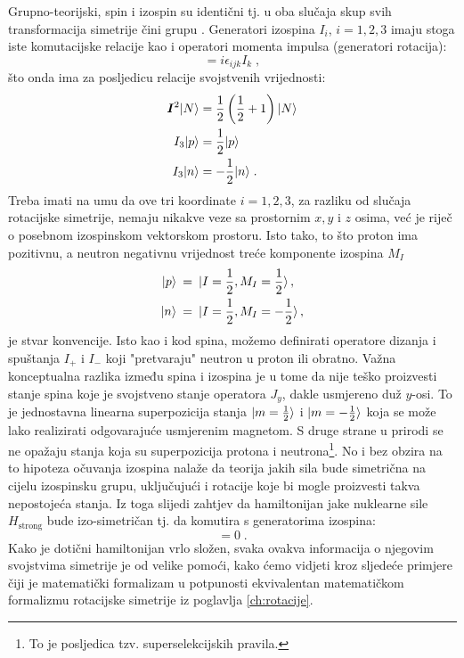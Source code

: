 Grupno-teorijski, spin i izospin su identični tj. u oba
slučaja skup svih transformacija simetrije čini grupu .
Generatori izospina $I_i$, $i=1,2,3$ imaju stoga iste komutacijske relacije
kao i operatori momenta impulsa (generatori rotacija):
\begin{equation}
  [I_i, I_j] = i \epsilon_{ijk} I_k  \;,
\end{equation}
što onda ima za posljedicu relacije svojstvenih vrijednosti:
\begin{align}
\vec{I}^2 \ket{N} &= \fhalf \left(\fhalf +1\right)  \ket{N} \\
I_3 \ket{p} &= \fhalf  \ket{p} \\
I_3 \ket{n} &= - \fhalf  \ket{n} \;.
\end{align}
Treba imati na umu da ove tri koordinate $i=1,2,3$, za razliku od
slučaja rotacijske simetrije, nemaju nikakve veze sa prostornim
$x, y$ i $z$ osima, već je riječ o posebnom izospinskom vektorskom prostoru.
Isto tako, to što proton ima pozitivnu, a neutron negativnu vrijednost
treće komponente izospina $M_I$
\begin{align}
   | p \rangle & \:=\: | I=\frac{1}{2}, M_I=\frac{1}{2} \rangle \,, \\
   | n \rangle & \:=\: | I=\frac{1}{2},M_I=-\frac{1}{2} \rangle \,,
\end{align}
je stvar konvencije.
Isto kao i kod spina, možemo definirati operatore dizanja i
spuštanja $I_+$ i $I_-$ koji "pretvaraju" neutron u proton
ili obratno. Važna konceptualna razlika između spina i izospina 
je u tome da nije teško proizvesti stanje spina koje je svojstveno
stanje operatora $J_y$, dakle usmjereno duž $y$-osi. To je jednostavna
linearna superpozicija stanja $| m=\frac{1}{2} \rangle$ i $| m=-\frac{1}{2} \rangle$ koja
se može lako realizirati odgovarajuće usmjerenim magnetom.
S druge strane u prirodi se ne opažaju stanja koja su superpozicija
protona i neutrona\footnote{To je posljedica tzv. superselekcijskih  pravila.}.
No i bez obzira na to hipoteza očuvanja izospina
nalaže da teorija jakih sila bude simetrična na cijelu izospinsku grupu,
uključujući i rotacije koje bi mogle proizvesti takva nepostojeća stanja.
Iz toga slijedi zahtjev da hamiltonijan
jake nuklearne sile $H_{\text{strong}}$ bude izo-simetričan tj. da komutira
s generatorima izospina:
\begin{equation}
   [H_{\text{strong}}, I_i] = 0 \;.
   \label{eq:HstrongI0}
\end{equation}
Kako je dotični hamiltonijan vrlo složen, svaka
ovakva informacija o njegovim svojstvima simetrije je od velike
pomoći, kako ćemo vidjeti kroz sljedeće primjere čiji je matematički
formalizam u potpunosti ekvivalentan matematičkom formalizmu
rotacijske simetrije iz poglavlja \ref{ch:rotacije}.

